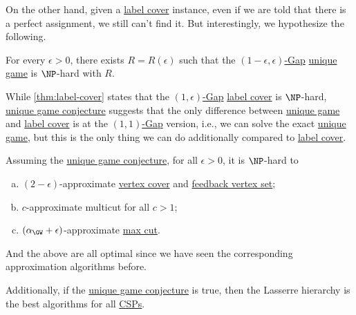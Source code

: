 On the other hand, given a \hyperref[prb:label-cover]{label cover} instance, even if we are told that there is a perfect assignment, we still can't find it. But interestingly, we hypothesize the following.

\begin{conjecture}\label{conj:unique-game}
	For every \(\epsilon > 0\), there exists \(R = R(\epsilon )\) such that the \hyperref[def:c-s-Gap]{\((1-\epsilon , \epsilon )\)-Gap} \hyperref[prb:unique-game]{unique game} is \(\NP\)-hard with \(R\).
\end{conjecture}

While \autoref{thm:label-cover} states that the \hyperref[def:c-s-Gap]{\((1, \epsilon )\)-Gap} \hyperref[prb:label-cover]{label cover} is \(\NP\)-hard, \hyperref[conj:unique-game]{unique game conjecture} suggests that the only difference between \hyperref[prb:unique-game]{unique game} and \hyperref[prb:label-cover]{label cover} is at the \hyperref[def:c-s-Gap]{\((1, 1)\)-Gap} version, i.e., we can solve the exact \hyperref[prb:unique-game]{unique game}, but this is the only thing we can do additionally compared to \hyperref[prb:label-cover]{label cover}.

\begin{remark}
	Assuming the \hyperref[conj:unique-game]{unique game conjecture}, for all \(\epsilon > 0\), it is \(\NP\)-hard to
	\begin{enumerate}[(a)]
		\item \((2-\epsilon )\)-approximate \hyperref[prb:vertex-cover]{vertex cover} and \hyperref[prb:feedback-vertex-set]{feedback vertex set};
		\item \(c\)-approximate multicut for all \(c > 1\);
		\item \((\alpha _{\GW } + \epsilon )\)-approximate \hyperref[prb:max-cut]{max cut}.
	\end{enumerate}
	And the above are all optimal since we have seen the corresponding approximation algorithms before.
\end{remark}

Additionally, if the \hyperref[conj:unique-game]{unique game conjecture} is true, then the Lasserre hierarchy is the best algorithms for all \hyperref[prb:CSP]{CSPs}.